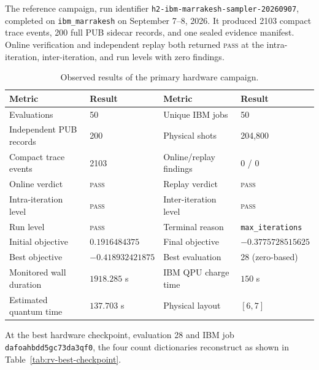 The reference campaign, run identifier
\texttt{h2-ibm-marrakesh-sampler-20260907}, completed on
\texttt{ibm\_marrakesh} on September 7--8, 2026.  It produced 2103 compact
trace events, 200 full PUB sidecar records, and one sealed evidence manifest.
Online verification and independent replay both returned \textsc{pass} at the
intra-iteration, inter-iteration, and run levels with zero findings.

\begin{table}[t]
  \centering
  \caption{Observed results of the primary hardware campaign.}
  \label{tab:rv-hardware-results}
  \renewcommand{\arraystretch}{1.1}
  \begin{tabular}{p{}p{}p{}p{}}
    \toprule
    Metric & Result & Metric & Result \\
    \midrule
    Evaluations & 50 & Unique IBM jobs & 50 \\
    Independent PUB records & 200 & Physical shots & 204,800 \\
    Compact trace events & 2103 & Online/replay findings & 0 / 0 \\
    Online verdict & \textsc{pass} & Replay verdict & \textsc{pass} \\
    Intra-iteration level & \textsc{pass} & Inter-iteration level & \textsc{pass} \\
    Run level & \textsc{pass} & Terminal reason & \texttt{max\_iterations} \\
    Initial objective & $0.1916484375$ & Final objective & $-0.3775728515625$ \\
    Best objective & $-0.418932421875$ & Best evaluation & 28 (zero-based) \\
    Monitored wall duration & $1918.285$ s & IBM QPU charge time & $150$ s \\
    Estimated quantum time & $137.703$ s & Physical layout & $[6,7]$ \\
    \bottomrule
  \end{tabular}
\end{table}

At the best hardware checkpoint, evaluation 28 and IBM job
\texttt{dafoahbdd5gc73da3qf0}, the four count dictionaries reconstruct as shown
in Table~\ref{tab:rv-best-checkpoint}.

